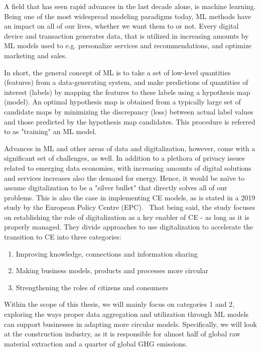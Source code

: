\documentclass[english, 12pt, a4paper, sci, utf8, a-2b, online]{aaltothesis}
\begin{document}
A field that has seen rapid advances in the last decade alone, is machine learning. Being one of the most widespread modeling paradigms today, ML methods
have an impact on all of our lives, whether we want them to or not. Every digital device and transaction generates data, that is utilized in increasing amounts by ML models used to
e.g. personalize services and recommendations, and optimize marketing and sales.

In short, the general concept of ML is to take a set of low-level quantities
(features) from a data-generating system, and make predictions of quantities of interest (labels) by mapping the features to these labels using a hypothesis map (model).
An optimal hypothesis map is obtained from a typically large set of candidate maps by minimizing the discrepancy (loss) between actual label values and those predicted
by the hypothesis map candidates. This procedure is referred to as "training" an ML model.~\cite{jung}

Advances in ML and other areas of data and digitalization, however, come with a significant set of challenges, as well. In addition to a plethora of privacy issues related to emerging
data economies, with increasing amounts of digital solutions and services increases also the demand for energy. Hence, it would be naïve to assume
digitalization to be a "silver bullet" that directly solves all of our problems. This is also the case in implementing CE models, as is stated in a 2019 study by the European
Policy Centre (EPC).~\cite{hedberg} That being said, the study focuses on establishing the role of digitalization as a key enabler of CE -
as long as it is properly managed. They divide approaches to use digitalization to accelerate the transition to CE into three categories:
\begin{enumerate}
  \item Improving knowledge, connections and information sharing
  \item Making business models, products and processes more circular
  \item Strengthening the roles of citizens and consumers
\end{enumerate}
Within the scope of this thesis, we will mainly focus on categories 1 and 2, exploring the ways proper data aggregation and utilization through ML models can support businesses in adapting
more circular models. Specifically, we will look at the construction industry, as it is responsible for almost half of global raw material extraction and a quarter of
global GHG emissions.~\cite{amro}
\end{document}
